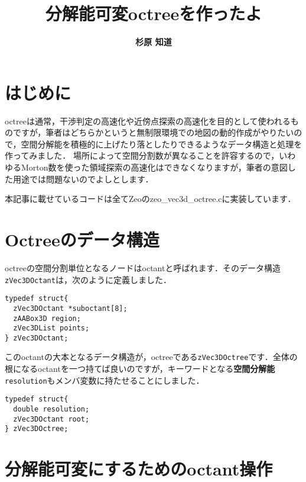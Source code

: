 ﻿\documentclass[a4paper]{jsarticle}
\title{\bf 分解能可変octreeを作ったよ}
\author{\Large{\bf 杉原 知道}}
\date{}
\begin{document}
\maketitle
\vspace{-\baselineskip}

\section{はじめに}

octreeは通常，干渉判定の高速化や近傍点探索の高速化を目的として使われるものですが，筆者はどちらかというと無制限環境での地図の動的作成がやりたいので，空間分解能を積極的に上げたり落としたりできるようなデータ構造と処理を作ってみました．
場所によって空間分割数が異なることを許容するので，いわゆるMorton数を使った領域探索の高速化はできなくなりますが，筆者の意図した用途では問題ないのでよしとします．

本記事に載せているコードは全てZeoのzeo\_vec3d\_octree.cに実装しています．


\section{Octreeのデータ構造}

octreeの空間分割単位となるノードはoctantと呼ばれます．そのデータ構造\verb|zVec3DOctant|は，次のように定義しました．
\begin{screen}
\begin{verbatim}
typedef struct{
  zVec3DOctant *suboctant[8];
  zAABox3D region;
  zVec3DList points;
} zVec3DOctant;
\end{verbatim}
\end{screen}
このoctantの大本となるデータ構造が，octreeである\verb|zVec3DOctree|です．全体の根になるoctantを一つ持てば良いのですが，キーワードとなる{\bf 空間分解能}\verb|resolution|もメンバ変数に持たせることにしました．
\begin{screen}
\begin{verbatim}
typedef struct{
  double resolution;
  zVec3DOctant root;
} zVec3DOctree;
\end{verbatim}
\end{screen}


\section{分解能可変にするためのoctant操作}
\end{document}
